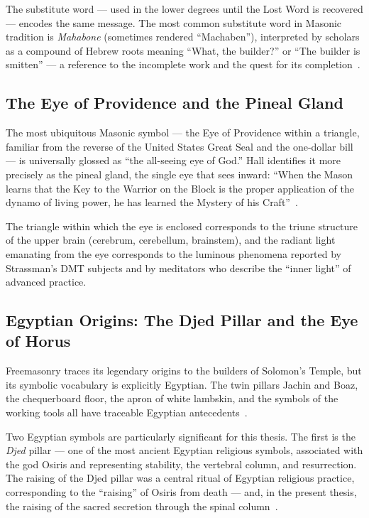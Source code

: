 \documentclass[12pt, a4paper]{article}
\begin{document}
The substitute word — used in the lower degrees until the Lost Word is
recovered — encodes the same message. The most common substitute word in
Masonic tradition is \emph{Mahabone} (sometimes rendered ``Machaben''),
interpreted by scholars as a compound of Hebrew roots meaning ``What, the
builder?'' or ``The builder is smitten'' — a reference to the incomplete work
and the quest for its completion~\autocite[439]{mackey1874}.

\subsection{The Eye of Providence and the Pineal Gland}

The most ubiquitous Masonic symbol — the Eye of Providence within a triangle,
familiar from the reverse of the United States Great Seal and the one-dollar
bill — is universally glossed as ``the all-seeing eye of God.'' Hall identifies
it more precisely as the pineal gland, the single eye that sees inward:
``When the Mason learns that the Key to the Warrior on the Block is the proper
application of the dynamo of living power, he has learned the Mystery of his
Craft''~\autocite[48]{hall1928}.

The triangle within which the eye is enclosed corresponds to the triune
structure of the upper brain (cerebrum, cerebellum, brainstem), and the
radiant light emanating from the eye corresponds to the luminous phenomena
reported by Strassman's DMT subjects and by meditators who describe the
``inner light'' of advanced practice.

\subsection{Egyptian Origins: The Djed Pillar and the Eye of Horus}

Freemasonry traces its legendary origins to the builders of Solomon's Temple,
but its symbolic vocabulary is explicitly Egyptian. The twin pillars Jachin
and Boaz, the chequerboard floor, the apron of white lambskin, and the symbols
of the working tools all have traceable Egyptian
antecedents~\autocite[311]{hall1928}.

Two Egyptian symbols are particularly significant for this thesis. The first
is the \emph{Djed} pillar — one of the most ancient Egyptian religious symbols,
associated with the god Osiris and representing stability, the vertebral
column, and resurrection. The raising of the Djed pillar was a central ritual
of Egyptian religious practice, corresponding to the ``raising'' of Osiris
from death — and, in the present thesis, the raising of the sacred secretion
through the spinal column~\autocite[201]{budge1904}.
\end{document}
